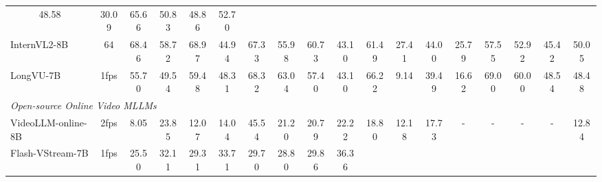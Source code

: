 \begin{table}[ht]
{\begin{tabular}{lccccccccccccccccc}
              \multicolumn{1}{c|}{48.58} &
              30.09 &
              65.66 &
              \multicolumn{1}{c|}{50.83} &
              \multicolumn{1}{c|}{48.86} &
              52.70 \\
            \multicolumn{1}{l|}{InternVL2-8B \cite{chen2024internvl2}} &
              \multicolumn{1}{c|}{64} &
              68.46 &
              58.72 &
              68.97 &
              44.94 &
              67.33 &
              \multicolumn{1}{c|}{55.98} &
              \multicolumn{1}{c|}{60.73} &
              43.10 &
              61.49 &
              \multicolumn{1}{c|}{27.41} &
              \multicolumn{1}{c|}{44.00} &
              25.79 &
              57.55 &
              \multicolumn{1}{c|}{52.92} &
              \multicolumn{1}{c|}{45.42} &
              50.05 \\
            \multicolumn{1}{l|}{LongVU-7B \cite{shen2024longvu}} &
              \multicolumn{1}{c|}{1fps} &
              55.70 &
              49.54 &
              59.48 &
              48.31 &
              68.32 &
              \multicolumn{1}{c|}{63.04} &
              \multicolumn{1}{c|}{57.40} &
              43.10 &
              66.22 &
              \multicolumn{1}{c|}{9.14} &
              \multicolumn{1}{c|}{39.49} &
              16.62 &
              69.00 &
              \multicolumn{1}{c|}{{60.00}} &
              \multicolumn{1}{c|}{48.54} &
              48.48 \\ \midrule
            \multicolumn{18}{l}{\textit{Open-source Online Video MLLMs}} \\ \midrule
            \multicolumn{1}{l|}{VideoLLM-online-8B \cite{chen2024videollmonline}} &
              \multicolumn{1}{c|}{2fps} &
              8.05 &
              23.85 &
              12.07 &
              14.04 &
              45.54 &
              \multicolumn{1}{c|}{21.20} &
              \multicolumn{1}{c|}{20.79} &
              22.22 &
              18.80 &
              \multicolumn{1}{c|}{{12.18}} &
              \multicolumn{1}{c|}{17.73} &
              - &
              - &
              \multicolumn{1}{c|}{-} &
              \multicolumn{1}{c|}{-} &
              12.84 \\ 
            \multicolumn{1}{l|}{Flash-VStream-7B \cite{zhang2024flashvstream}} &
              \multicolumn{1}{c|}{1fps} &
              25.50 &
              32.11 &
              29.31 &
              33.71 &
              29.70 &
              \multicolumn{1}{c|}{28.80} &
              \multicolumn{1}{c|}{29.86} &
              36.36 &

\end{tabular}}
\end{table}
